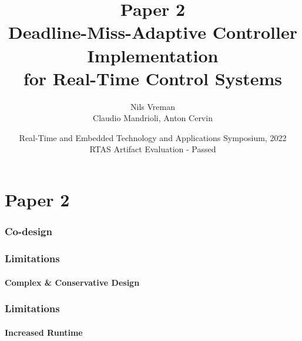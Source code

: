 \section{Paper 2}

\title[PhD Defence]{
    {\Huge Paper 2} \\
    \vspace{2mm}
    {\Large Deadline-Miss-Adaptive Controller Implementation} \\
    {\Large for Real-Time Control Systems}
}
\author[Nils Vreman]{
    Nils Vreman \\
    \vspace{3mm}
    {\large Claudio Mandrioli, Anton Cervin}
}
\date[RTAS 2022]{
    Real-Time and Embedded Technology and Applications Symposium, 2022\\
    {\large RTAS Artifact Evaluation - Passed}
}
\notitlelogo
{}

\begin{frame}
    \frametitle{Co-design}
    \vspace{-1.5cm}%
    \begin{figure}[h]
    \end{figure}
\end{frame}

\begin{frame}
    \frametitle{Limitations}
    \framesubtitle{Complex \& Conservative Design}
    \vspace{5mm}
    \begin{figure}
        \centerline{}
    \end{figure}
\end{frame}

\begin{frame}
    \frametitle{Limitations}
    \framesubtitle{Increased Runtime}
    \vspace{5mm}
    \begin{figure}
        \centerline{}
    \end{figure}
\end{frame}


